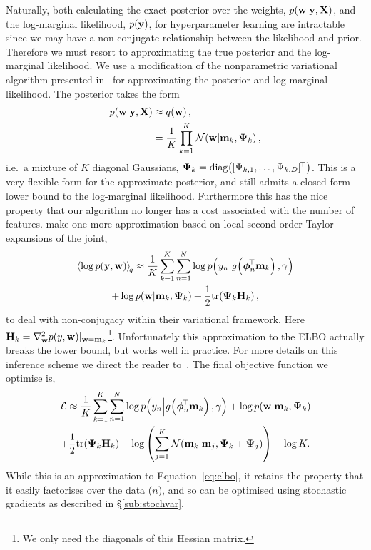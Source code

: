 \documentclass[11pt, oneside]{article}
\begin{document}
Naturally, both calculating the exact posterior over the weights,
$\probC{\weights}{\targ, \ins}$, and the log-marginal likelihood,
$\prob{\targ}$, for hyperparameter learning are intractable since we may have a
non-conjugate relationship between the likelihood and prior. Therefore we must
resort to approximating the true posterior and the log-marginal likelihood.
We use a modification of the nonparametric variational algorithm
presented in~\cite{gershman2012} for approximating the posterior and log
marginal likelihood. The posterior takes the form
\begin{align}
    \probC{\weights}{\targ, \ins} &\approx \qrob{\weights}, \nonumber \\
    &= \frac{1}{K} \prod^K_{k=1} \gausC{\weights}{\pomean_k, \dpocov_k},
\end{align}
i.e.\ a mixture of $K$ diagonal Gaussians, $\dpocov_k = \diag{[\dpocovs_{k,1},
    \ldots, \dpocovs_{k, D}]\T}$. This is a very flexible form for the
approximate posterior, and still admits a closed-form lower bound to the
log-marginal likelihood. Furthermore this has the nice property that our
algorithm no longer has a  cost associated with the number of
features. \citet{gershman2012} make one more approximation based on local
second order Taylor expansions of the joint,
\begin{multline}
    \expec{q}{\log \prob{\targ, \weights}} \approx
    \frac{1}{K} \sum^K_{k=1} \sum^N_{n=1} 
    \log \probC{\targs_n}{\activ{\feats_n\T \pomean_k}, \lparam} \\
    + \log \probC{\weights}{\pomean_k, \dpocov_k}
    + \frac{1}{2} \trace{\dpocov_k\hess{k}},
\end{multline}
to deal with non-conjugacy within their variational framework. Here $\hess{k} =
\nabla^2_{\weights} \prob{\targs, \weights}\!|_{\weights =
    \pomean_k}$\footnote{We only need the diagonals of this Hessian matrix.}.
Unfortunately this approximation to the ELBO actually breaks the lower bound,
but works well in practice. For more details on this inference scheme we direct
the reader to~\cite{gershman2012}. The final objective function we optimise is,
\begin{multline}
    \elbo \approx
    \frac{1}{K} \sum^K_{k=1} \sum^N_{n=1} 
    \log \probC{\targs_n}{\activ{\feats_n\T \pomean_k}, \lparam}
    + \log \probC{\weights}{\pomean_k, \dpocov_k} \\
    + \frac{1}{2} \trace{\dpocov_k\hess{k}}
    - \log \brac{\sum^K_{j=1} \gausC{\pomean_k}{\pomean_j, \dpocov_k +
            \dpocov_j}} - \log K. \label{eq:glmobj}
\end{multline}
While this is an approximation to Equation~\eqref{eq:elbo}, it retains the
property that it easily factorises over the data ($n$), and so can be optimised
using stochastic gradients as described in \S \ref{sub:stochvar}.
\end{document}
